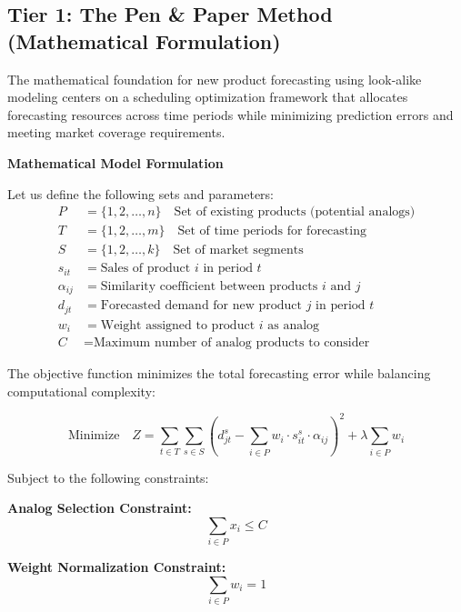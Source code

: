 \documentclass{article}
\begin{document}
\subsection{Tier 1: The Pen \& Paper Method (Mathematical Formulation)}

The mathematical foundation for new product forecasting using look-alike modeling centers on a scheduling optimization framework that allocates forecasting resources across time periods while minimizing prediction errors and meeting market coverage requirements.

\textbf{Mathematical Model Formulation}

Let us define the following sets and parameters:
\begin{align}
P &= \{1, 2, \ldots, n\} \quad \text{Set of existing products (potential analogs)} \\
T &= \{1, 2, \ldots, m\} \quad \text{Set of time periods for forecasting} \\
S &= \{1, 2, \ldots, k\} \quad \text{Set of market segments} \\
s_{it} &= \text{Sales of product } i \text{ in period } t \\
\alpha_{ij} &= \text{Similarity coefficient between products } i \text{ and } j \\
d_{jt} &= \text{Forecasted demand for new product } j \text{ in period } t \\
w_i &= \text{Weight assigned to product } i \text{ as analog} \\
C &= \text{Maximum number of analog products to consider}
\end{align}

The objective function minimizes the total forecasting error while balancing computational complexity:

\begin{equation}
\text{Minimize} \quad Z = \sum_{t \in T} \sum_{s \in S} \left( d_{jt}^s - \sum_{i \in P} w_i \cdot s_{it}^s \cdot \alpha_{ij} \right)^2 + \lambda \sum_{i \in P} w_i
\end{equation}

Subject to the following constraints:

\textbf{Analog Selection Constraint:}
\begin{equation}
\sum_{i \in P} x_i \leq C
\end{equation}

\textbf{Weight Normalization Constraint:}
\begin{equation}
\sum_{i \in P} w_i = 1
\end{equation}
\end{document}
